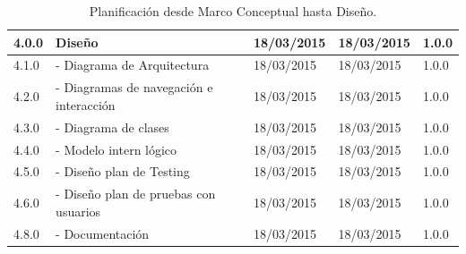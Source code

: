\documentclass[12pt,letterpaper]{article}
\begin{document}
\begin{table}[htf]
\begin{tabular}{| l | p{6cm} | l | l | l |}
\textbf{\small 4.0.0} & 
\textbf{\small Diseño} & 
\textbf{\small 18/03/2015} &  
\textbf{\small 18/03/2015} & 
\textbf{\small 1.0.0} \\ \hline

\small 4.1.0 & 
\small - Diagrama de Arquitectura & 
\small 18/03/2015 &  
\small 18/03/2015 & 
\small 1.0.0 \\ \hline

\small 4.2.0 & 
\small - Diagramas de navegación e interacción  & 
\small 18/03/2015 &  
\small 18/03/2015 & 
\small 1.0.0 \\ \hline

\small 4.3.0 & 
\small - Diagrama de clases & 
\small 18/03/2015 &  
\small 18/03/2015 & 
\small 1.0.0 \\ \hline

\small 4.4.0 & 
\small - Modelo intern lógico & 
\small 18/03/2015 &  
\small 18/03/2015 & 
\small 1.0.0 \\ \hline

\small 4.5.0 & 
\small - Diseño plan de Testing & 
\small 18/03/2015 &  
\small 18/03/2015 & 
\small 1.0.0 \\ \hline

\small 4.6.0 & 
\small - Diseño plan de pruebas con usuarios & 
\small 18/03/2015 &  
\small 18/03/2015 & 
\small 1.0.0 \\ \hline

\small 4.8.0 & 
\small - Documentación & 
\small 18/03/2015 &  
\small 18/03/2015 & 
\small 1.0.0 \\ \hline


\hline
\end{tabular}
\caption{Planificación desde Marco Conceptual hasta Diseño.}
\end{table}

\newpage
\clearpage
\end{document}
